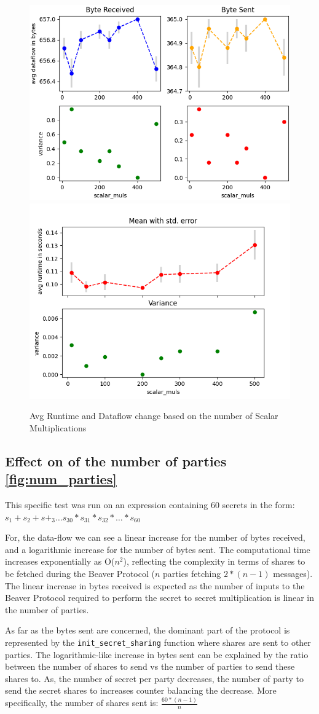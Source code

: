 \documentclass[10pt,conference,compsocconf]{IEEEtran}
\begin{document}
\begin{figure}[h!]
    \centering
    \includegraphics[width=0.49\linewidth]{../performance_analysis/dataflow_scalar_multiplications.png}
    \includegraphics[width=0.49\linewidth]{../performance_analysis/runtime_scalar_multiplications.png}
    \caption{Avg Runtime and Dataflow change based on the number of Scalar Multiplications}
    \label{fig:scalar_mult}
\end{figure}


\subsection{Effect on of the number of parties \ref{fig:num_parties}}
This specific test was run on an expression containing 60 secrets in the form: $s_1 + s_2 + s+_3 \dots s_{30} * s_{31} *
s_{32} * \dots*  s_{60}$

For, the data-flow we can see a linear increase for the number of bytes received, and a logarithmic increase for the
number of bytes sent.
The computational time increases exponentially as O($n^2$), reflecting the complexity in terms of shares to be fetched during the Beaver Protocol ($n$ parties fetching $2*(n-1)$ messages).
The linear increase in bytes received is expected as the number of inputs to the Beaver Protocol  required to perform the secret to secret multiplication is linear in the number of parties.

As far as the bytes sent are concerned, the dominant part of the protocol is represented by the \texttt{init\_secret\_sharing} function where shares are sent to other parties.
The logarithmic-like increase in bytes sent can be explained by the ratio between the number of shares to send vs the
number of parties to send these shares to.
As, the number of secret per party decreases, the number of party to send the secret shares to increases counter balancing
the decrease.
More specifically, the number of shares sent is: $\frac{60*(n-1)}{n}$
\end{document}
